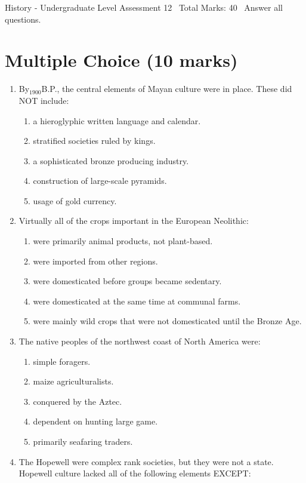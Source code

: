 \documentclass[12pt]{article}
\begin{document}
\begin{center}
History - Undergraduate Level Assessment 12 \
Total Marks: 40 \
Answer all questions.
\end{center}

\section*{Multiple Choice (10 marks)}
\begin{enumerate}[label=\arabic*.]
\item By$_{1900}$B.P., the central elements of Mayan culture were in place. These did NOT include:
\begin{enumerate}[label=(\alph*)]
    \item a hieroglyphic written language and calendar.
    \item stratified societies ruled by kings.
    \item a sophisticated bronze producing industry.
    \item construction of large-scale pyramids.
    \item usage of gold currency.
\end{enumerate}
\item Virtually all of the crops important in the European Neolithic:
\begin{enumerate}[label=(\alph*)]
    \item were primarily animal products, not plant-based.
    \item were imported from other regions.
    \item were domesticated before groups became sedentary.
    \item were domesticated at the same time at communal farms.
    \item were mainly wild crops that were not domesticated until the Bronze Age.
\end{enumerate}
\item The native peoples of the northwest coast of North America were:
\begin{enumerate}[label=(\alph*)]
    \item simple foragers.
    \item maize agriculturalists.
    \item conquered by the Aztec.
    \item dependent on hunting large game.
    \item primarily seafaring traders.
\end{enumerate}
\item The Hopewell were complex rank societies, but they were not a state. Hopewell culture lacked all of the following elements EXCEPT:

\end{enumerate}
\end{document}
